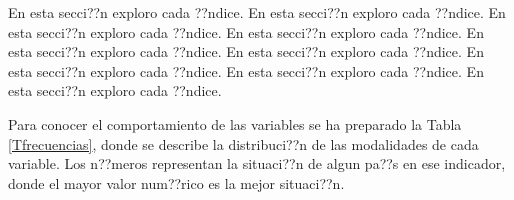 \documentclass{article}
\begin{document}
En esta secci??n exploro cada ??ndice. En esta secci??n exploro cada ??ndice. En esta secci??n exploro cada ??ndice. En esta secci??n exploro cada ??ndice. En esta secci??n exploro cada ??ndice. En esta secci??n exploro cada ??ndice. En esta secci??n exploro cada ??ndice. En esta secci??n exploro cada ??ndice. En esta secci??n exploro cada ??ndice.





Para conocer el comportamiento de las variables se ha preparado la Tabla \ref{Tfrecuencias}, donde se describe la distribuci??n de las modalidades de cada variable. Los n??meros representan la situaci??n de algun pa??s en ese indicador, donde el mayor valor num??rico es la mejor situaci??n.

\begingroup\normalsize
\end{document}
